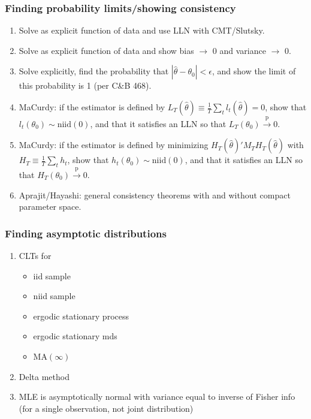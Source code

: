 \documentclass[8pt,letterpaper, landscape]{extarticle} %
\begin{document}
\begin{multicols}{3}
\begin{description}
\subsubsection*{Finding probability limits/showing consistency}
\begin{enumerate}
\item Solve as explicit function of data and use LLN with CMT/Slutsky.
\item Solve as explicit function of data and show bias $ \to $ 0 and variance $ \to $ 0.
\item Solve explicitly, find the probability that $ | \hat{\theta} - \theta_0 | < \epsilon $, and show the limit of this probability is 1 (per C\&B 468).
\item MaCurdy: if the estimator is defined by $ L_T (\hat{\theta}) \equiv \frac{1}{T} \sum_t l_t (\hat{\theta}) = 0 $, show that $ l_t (\theta_0) \sim \text{niid} (0) $, and that it satisfies an LLN so that $ L_T (\theta_0) \xrightarrow{\text{p}} 0 $.
\item MaCurdy: if the estimator is defined by minimizing $ H_T(\hat{\theta})' M_T H_T (\hat{\theta}) $ with $ H_T \equiv \frac{1}{T} \sum_t h_t $, show that $ h_t (\theta_0) \sim \text{niid} (0) $, and that it satisfies an LLN so that $ H_T (\theta_0) \xrightarrow{\text{p}} 0 $.
\item Aprajit/Hayashi: general consistency theorems with and without compact parameter space.
\end{enumerate}

\subsubsection*{Finding asymptotic distributions}
\begin{enumerate}
\item CLTs for
\begin{itemize}
\item iid sample
\item niid sample
\item ergodic stationary process
\item ergodic stationary mds
\item $ \text{MA} (\infty ) $
\end{itemize}
\item Delta method
\item MLE is asymptotically normal with variance equal to inverse of
Fisher info (for a single observation, not joint distribution)
\end{enumerate}


\end{description}
\end{multicols}
\end{document}
